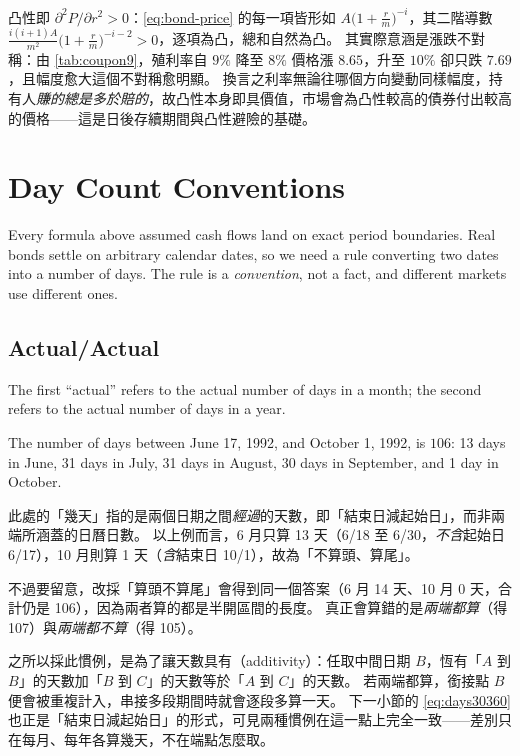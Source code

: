 \suppstart
\begin{remark}
	凸性即 $\partial^{2}P/\partial r^{2} > 0$：\eqref{eq:bond-price} 的每一項皆形如 $A\bigl(1+\frac{r}{m}\bigr)^{-i}$，其二階導數 $\frac{i(i+1)A}{m^{2}}\bigl(1+\frac{r}{m}\bigr)^{-i-2} > 0$，逐項為凸，總和自然為凸。
	其實際意涵是漲跌不對稱：由 \autoref{tab:coupon9}，殖利率自 $9\%$ 降至 $8\%$ 價格漲 $8.65$，升至 $10\%$ 卻只跌 $7.69$，且幅度愈大這個不對稱愈明顯。
	換言之利率無論往哪個方向變動同樣幅度，持有人\emph{賺的總是多於賠的}，故凸性本身即具價值，市場會為凸性較高的債券付出較高的價格——這是日後存續期間與凸性避險的基礎。
\end{remark}
\suppend


\section{Day Count Conventions}
\label{sec:day-count}


Every formula above assumed cash flows land on exact period boundaries.
Real bonds settle on arbitrary calendar dates, so we need a rule converting two dates into a number of days.
The rule is a \emph{convention}, not a fact, and different markets use different ones.

\subsection{Actual/Actual}

The first ``actual'' refers to the actual number of days in a month; the second refers to the actual number of days in a year.

\begin{eg}
	The number of days between June 17, 1992, and October 1, 1992, is $106$: 13 days in June, 31 days in July, 31 days in August, 30 days in September, and 1 day in October.
\end{eg}

\suppstart
\begin{remark}
	此處的「幾天」指的是兩個日期之間\emph{經過}的天數，即「結束日減起始日」，而非兩端所涵蓋的日曆日數。
	以上例而言，6 月只算 13 天（6/18 至 6/30，\emph{不含}起始日 6/17），10 月則算 1 天（\emph{含}結束日 10/1），故為「不算頭、算尾」。

	不過要留意，改採「算頭不算尾」會得到同一個答案（6 月 14 天、10 月 0 天，合計仍是 106），因為兩者算的都是半開區間的長度。
	真正會算錯的是\emph{兩端都算}（得 107）與\emph{兩端都不算}（得 105）。

	之所以採此慣例，是為了讓天數具有（additivity）：任取中間日期 $B$，恆有「$A$ 到 $B$」的天數加「$B$ 到 $C$」的天數等於「$A$ 到 $C$」的天數。
	若兩端都算，銜接點 $B$ 便會被重複計入，串接多段期間時就會逐段多算一天。
	下一小節的 \eqref{eq:days30360} 也正是「結束日減起始日」的形式，可見兩種慣例在這一點上完全一致——差別只在每月、每年各算幾天，不在端點怎麼取。
\end{remark}
\suppend


